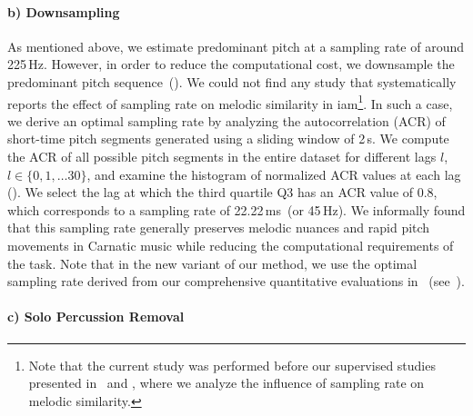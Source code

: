 \paragraph{b) Downsampling} 
As mentioned above, we estimate predominant pitch at a sampling rate of around 225\,Hz. However, in order to reduce the computational cost, we downsample the predominant pitch sequence~(). We could not find any study that systematically reports the effect of sampling rate on melodic similarity in \gls{iam}\footnote{Note that the current study was performed before our supervised studies presented in~ and , where we analyze the influence of sampling rate on melodic similarity.}. In such a case, we derive an optimal sampling rate by analyzing the autocorrelation (ACR) of short-time pitch segments generated using a sliding window of 2\,s. We compute the ACR of all possible pitch segments in the entire dataset for different lags $l$, $l\in \lbrace0,1,\dots30\rbrace$, and examine the histogram of normalized ACR values at each lag (). We select the lag at which the third quartile Q3 has an ACR value of 0.8, which corresponds to a sampling rate of 22.22\,ms~(or 45\,Hz). We informally found that this sampling rate generally preserves melodic nuances and rapid pitch movements in Carnatic music while reducing the computational requirements of the task. Note that in the new variant of our method, we use the optimal sampling rate derived from our comprehensive quantitative evaluations in~\cite{gulati_ICASSP2015} (see~). %




\paragraph{c) Solo Percussion Removal} 

